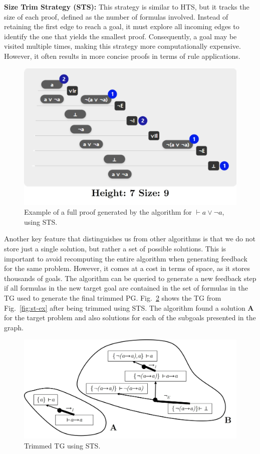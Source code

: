 \textbf{Size Trim Strategy (STS):} This strategy is similar to HTS, but it tracks the size of each proof, defined as the number of formulas involved. Instead of retaining the first edge to reach a goal, it must explore all incoming edges to identify the one that yields the smallest proof. Consequently, a goal may be visited multiple times, making this strategy more computationally expensive. However, it often results in more concise proofs in terms of rule applications.

\begin{figure}[h]
    \centering
    \includegraphics[width=0.6\linewidth]{resources/trim-size.jpg}
    \caption{Example of a full proof generated by the algorithm for \(\vdash a \vee \lnot a\), using STS.}
    \label{fig:sg-trim-size}
\end{figure}

Another key feature that distinguishes us from other algorithms is that we do not store just a single solution, but rather a set of possible solutions. This is important to avoid recomputing the entire algorithm when generating feedback for the same problem. However, it comes at a cost in terms of space, as it stores thousands of goals. The algorithm can be queried to generate a new feedback step if all formulas in the new target goal are contained in the set of formulas in the TG used to generate the final trimmed PG. Fig.~\ref{fig:sg-trim} shows the TG from Fig.~\ref{fig:st-ex} after being trimmed using STS. The algorithm found a solution \textbf{A} for the target problem and also solutions for each of the subgoals presented in the graph.
\begin{figure}[h]
    \centering
    \includegraphics[width=0.8\linewidth]{resources/sg-final.jpg}
    \caption{Trimmed TG using STS.}
    \label{fig:sg-trim}
\end{figure}
